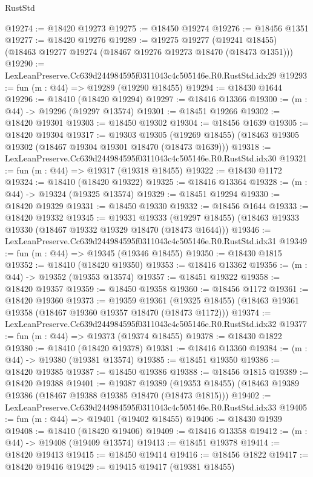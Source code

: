 \begin{lexlean}{RustStd}
\begin{coremodule}
@19274 := @18420 @19273
@19275 := @18450 @19274
@19276 := @18456 @1351
@19277 := @18420 @19276
@19289 := @19275
    @19277
    (@19241 @18455)
    (@18463 @19277 @19274 (@18467 @19276 @19273 @18470 (@18473 @1351)))
@19290 := LexLeanPreserve.Cc639d244984595f0311043c4c505146e.R0.RustStd.idx29
@19293 := fun (m : @44) => @19289 (@19290 @18455)
@19294 := @18430 @1644
@19296 := @18410 (@18420 @19294)
@19297 := @18416 @13366
@19300 := (m : @44) -> @19296 (@19297 @13574)
@19301 := @18451 @19266
@19302 := @18420 @19301
@19303 := @18450 @19302
@19304 := @18456 @1639
@19305 := @18420 @19304
@19317 := @19303
    @19305
    (@19269 @18455)
    (@18463 @19305 @19302 (@18467 @19304 @19301 @18470 (@18473 @1639)))
@19318 := LexLeanPreserve.Cc639d244984595f0311043c4c505146e.R0.RustStd.idx30
@19321 := fun (m : @44) => @19317 (@19318 @18455)
@19322 := @18430 @1172
@19324 := @18410 (@18420 @19322)
@19325 := @18416 @13364
@19328 := (m : @44) -> @19324 (@19325 @13574)
@19329 := @18451 @19294
@19330 := @18420 @19329
@19331 := @18450 @19330
@19332 := @18456 @1644
@19333 := @18420 @19332
@19345 := @19331
    @19333
    (@19297 @18455)
    (@18463 @19333 @19330 (@18467 @19332 @19329 @18470 (@18473 @1644)))
@19346 := LexLeanPreserve.Cc639d244984595f0311043c4c505146e.R0.RustStd.idx31
@19349 := fun (m : @44) => @19345 (@19346 @18455)
@19350 := @18430 @1815
@19352 := @18410 (@18420 @19350)
@19353 := @18416 @13362
@19356 := (m : @44) -> @19352 (@19353 @13574)
@19357 := @18451 @19322
@19358 := @18420 @19357
@19359 := @18450 @19358
@19360 := @18456 @1172
@19361 := @18420 @19360
@19373 := @19359
    @19361
    (@19325 @18455)
    (@18463 @19361 @19358 (@18467 @19360 @19357 @18470 (@18473 @1172)))
@19374 := LexLeanPreserve.Cc639d244984595f0311043c4c505146e.R0.RustStd.idx32
@19377 := fun (m : @44) => @19373 (@19374 @18455)
@19378 := @18430 @1822
@19380 := @18410 (@18420 @19378)
@19381 := @18416 @13360
@19384 := (m : @44) -> @19380 (@19381 @13574)
@19385 := @18451 @19350
@19386 := @18420 @19385
@19387 := @18450 @19386
@19388 := @18456 @1815
@19389 := @18420 @19388
@19401 := @19387
    @19389
    (@19353 @18455)
    (@18463 @19389 @19386 (@18467 @19388 @19385 @18470 (@18473 @1815)))
@19402 := LexLeanPreserve.Cc639d244984595f0311043c4c505146e.R0.RustStd.idx33
@19405 := fun (m : @44) => @19401 (@19402 @18455)
@19406 := @18430 @1939
@19408 := @18410 (@18420 @19406)
@19409 := @18416 @13358
@19412 := (m : @44) -> @19408 (@19409 @13574)
@19413 := @18451 @19378
@19414 := @18420 @19413
@19415 := @18450 @19414
@19416 := @18456 @1822
@19417 := @18420 @19416
@19429 := @19415
    @19417
    (@19381 @18455)

\end{coremodule}
\end{lexlean}
